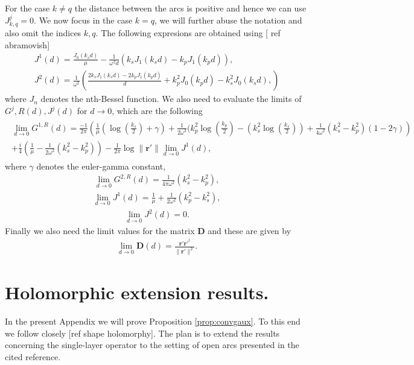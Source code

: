 \documentclass{article}
\newcommand{\todo}[1]{{\color{red}[#1]}}
\begin{document}
For the case $k \neq q$ the distance between the arcs is positive and hence we can use $J^j_{k,q} = 0$. We now focus in the case $k=q$, we will further abuse the notation and also omit the indices $k,q$.
The following expresions are obtained using \todo{ ref abramovish}
\begin{align*}
J^1(d) = \frac{J_0(k_s d)}{\mu}- \frac{1}{\omega^2 d}(k_sJ_1(k_s d) - k_p J_1(k_p d)), \\
J^2(d) = \frac{1}{\omega^2} \left(
\frac{2k_s J_1(k_sd)-2k_p J_1(k_p d)}{d} +k_p^2J_0(k_p d) -k_s^2J_0(k_s d),
\right)
\end{align*}
where $J_n$ denotes the nth-Bessel function. We also need to evaluate the limits of $G^j,R(d), J^j(d)$ for $d \rightarrow 0$, which are the following
\begin{align*}
\begin{split}
\lim_{d \rightarrow 0} G^{1,R}(d) = \frac{-1}{2\pi} \left(
\frac{1}{\mu} (\log (\frac{k_s}{2})+\gamma)+ \frac{1}{2 \omega^2}(k_p^2\log(\frac{k_p}{2})-
(k_s^2\log(\frac{k_s}{2}))
+\frac{1}{4 \omega^2} (k_s^2-k_p^2)(1-2\gamma)\right)\\
+\frac{i}{4}\left(
\frac{1}{\mu}- \frac{1}{2\omega^2}(k_s^2-k_p^2)
\right)
-\frac{1}{2\pi} \log \| \mathbf{r}'\| \lim_{d \rightarrow 0}J^1(d),
\end{split}
\end{align*}
where $\gamma$ denotes the euler-gamma constant,
\begin{align*}
\lim_{d \rightarrow 0} G^{2,R}(d) = \frac{1}{4\pi\omega^2}(k_s^2-k_p^2),
\end{align*}
\begin{align*}
\lim_{d \rightarrow 0} J^1(d) = \frac{1}{\mu} + \frac{1}{2\omega^2}(k_p^2-k_s^2),
\end{align*}
\begin{align*}
\lim_{d \rightarrow 0} J^2(d) = 0.
\end{align*}
Finally we also need the limit values for the matrix $\mathbf{D}$ and these are given by 
\begin{align*}
\lim_{d \rightarrow 0} \mathbf{D}(d) = \frac{\mathbf{r}' \mathbf{{r'}}^{t}}{\| \mathbf{r}'\|^2}.
\end{align*} 

\section{Holomorphic extension results.}

In the present Appendix we will prove Proposition \ref{prop:convgaux}. To this end we follow closely \todo{ref shape holomorphy}. The plan is to extend the results concerning the single-layer operator to the setting of open arcs presented in the cited reference. 
\end{document}

